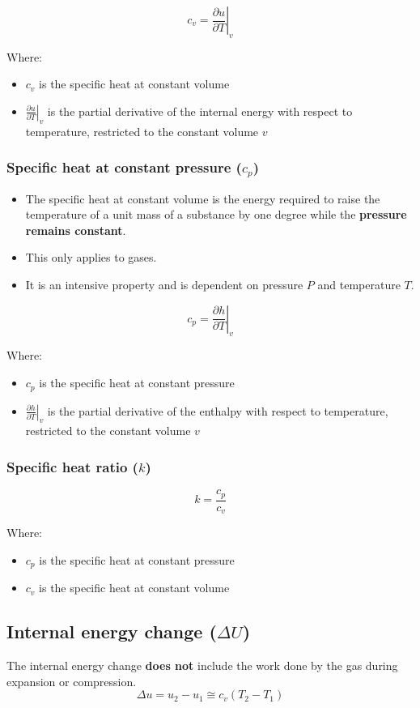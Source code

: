 \documentclass[11pt]{article}
\begin{document}
\[c_v = \left. \frac{\partial u}{\partial T} \right|_v\]

Where:
\begin{itemize}
\item \(c_v\) is the specific heat at constant volume
\item \(\left. \frac{\partial u}{\partial T} \right|_v\) is the partial derivative of the internal energy with respect to temperature, restricted to the constant volume \(v\)
\end{itemize}

\subsubsection{Specific heat at constant pressure (\(c_p\))}
\label{sec:orgad85ea8}
\begin{itemize}
\item The specific heat at constant volume is the energy required to raise the temperature of a unit mass of a substance by one degree while the \textbf{pressure remains constant}.
\item This only applies to gases.
\item It is an intensive property and is dependent on pressure \(P\) and temperature \(T\).
\end{itemize}

\[c_p = \left. \frac{\partial h}{\partial T} \right|_v\]

Where:
\begin{itemize}
\item \(c_p\) is the specific heat at constant pressure
\item \(\left. \frac{\partial h}{\partial T} \right|_v\) is the partial derivative of the enthalpy with respect to temperature, restricted to the constant volume \(v\)
\end{itemize}

\subsubsection{Specific heat ratio (\(k\))}
\label{sec:orgb9c58f8}
\[k = \frac{c_p}{c_v}\]

Where:
\begin{itemize}
\item \(c_p\) is the specific heat at constant pressure
\item \(c_v\) is the specific heat at constant volume
\end{itemize}

\subsection{Internal energy change (\(\Delta U\))}
\label{sec:org89bd539}
The internal energy change \textbf{does not} include the work done by the gas during expansion or compression.
\[\Delta u = u_2 - u_1 \cong c_v \left(T_2 - T_1 \right)\]
\end{document}
